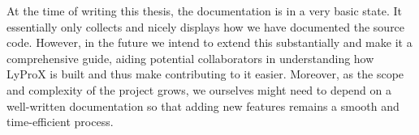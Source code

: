 \documentclass[\relativeRoot/main.tex]{subfiles}
\begin{document}
At the time of writing this thesis, the documentation is in a very basic state. It essentially only collects and nicely displays how we have documented the source code. However, in the future we intend to extend this substantially and make it a comprehensive guide, aiding potential collaborators in understanding how LyProX is built and thus make contributing to it easier. Moreover, as the scope and complexity of the project grows, we ourselves might need to depend on a well-written documentation so that adding new features remains a smooth and time-efficient process.
\end{document}
